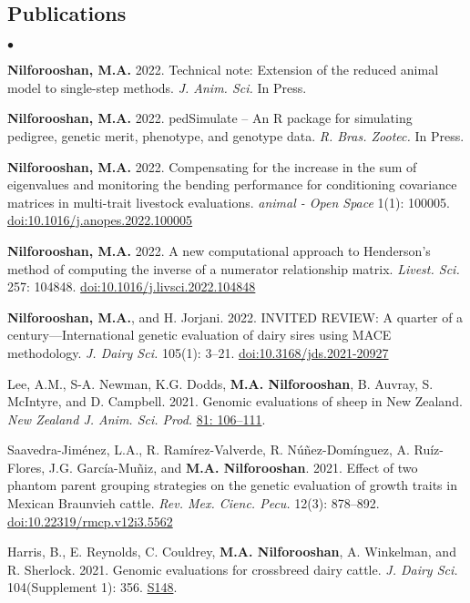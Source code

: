 \documentclass[margin,line]{res}
\newenvironment{list2}{
  \begin{list}{$\bullet$}{%
      \setlength{\itemsep}{0in}
      \setlength{\parsep}{0in} \setlength{\parskip}{0in}
      \setlength{\topsep}{0in} \setlength{\partopsep}{0in}
      \setlength{\leftmargin}{0.2in}}}{\end{list}}
\begin{document}
\begin{resume}
\section{\sc Publications}

\begin{list2}
\item {\bf Nilforooshan, M.A.} 2022. Technical note: Extension of the reduced animal model to single-step methods. {\em J. Anim. Sci.} In Press.
\item {\bf Nilforooshan, M.A.} 2022. pedSimulate -- An R package for simulating pedigree, genetic merit, phenotype, and genotype data. {\em R. Bras. Zootec.} In Press.
\item {\bf Nilforooshan, M.A.} 2022. Compensating for the increase in the sum of eigenvalues and monitoring the bending performance for conditioning covariance matrices in multi-trait livestock evaluations. {\em animal - Open Space} 1(1): 100005. \href{https://doi.org/10.1016/j.anopes.2022.100005}{doi:10.1016/j.anopes.2022.100005}
\item {\bf Nilforooshan, M.A.} 2022. A new computational approach to Henderson's method of computing the inverse of a numerator relationship matrix. {\em Livest. Sci.} 257: 104848. \href{https://doi.org/10.1016/j.livsci.2022.104848}{doi:10.1016/j.livsci.2022.104848}
\item {\bf Nilforooshan, M.A.}, and H. Jorjani. 2022. INVITED REVIEW: A quarter of a century---International genetic evaluation of dairy sires using MACE methodology. {\em J. Dairy Sci.} 105(1): 3--21. \href{https://doi.org/10.3168/jds.2021-20927}{doi:10.3168/jds.2021-20927}
\item Lee, A.M., S-A. Newman, K.G. Dodds, {\bf M.A. Nilforooshan}, B. Auvray, S. McIntyre, and D. Campbell. 2021. Genomic evaluations of sheep in New Zealand. {\em New Zealand J. Anim. Sci. Prod.} \href{http://www.nzsap.org/proceedings/genomic-evaluations-sheep-new-zealand}{81: 106--111}.
\item Saavedra-Jim\'{e}nez, L.A., R. Ram\'{i}rez-Valverde, R. N\'{u}\~{n}ez-Dom\'{i}nguez, A. Ru\'{i}z-Flores, J.G. Garc\'{i}a-Mu\~{n}iz, and {\bf M.A. Nilforooshan}. 2021. Effect of two phantom parent grouping strategies on the genetic evaluation of growth traits in Mexican Braunvieh cattle. {\em Rev. Mex. Cienc. Pecu.} 12(3): 878--892. \href{https://doi.org/10.22319/rmcp.v12i3.5562}{doi:10.22319/rmcp.v12i3.5562}
\item Harris, B., E. Reynolds, C. Couldrey, {\bf M.A. Nilforooshan}, A. Winkelman, and R. Sherlock. 2021. Genomic evaluations for crossbreed dairy cattle. {\em J. Dairy Sci.} 104(Supplement 1): 356. \href{https://www.adsa.org/Portals/0/SiteContent/Docs/Meetings/2021ADSA/ADSA2021_Abstracts.pdf}{S148}.

\end{list2}
\end{resume}
\end{document}
